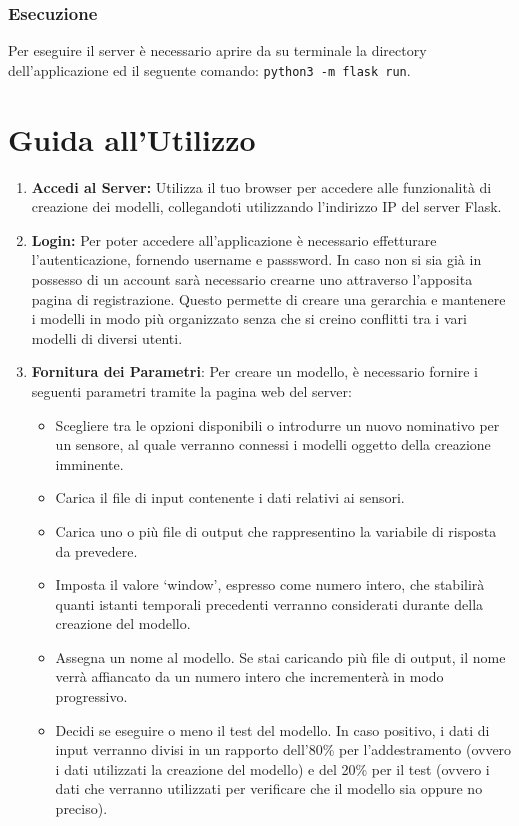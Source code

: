 \documentclass[a4paper,10pt]{article}
\begin{document}
\subsubsection*{Esecuzione}
Per eseguire il server è necessario aprire da su terminale la directory dell'applicazione ed
il seguente comando: \texttt{python3 -m flask run}.



\section{Guida all'Utilizzo}
\begin{enumerate}
  \item \textbf{Accedi al Server:} Utilizza il tuo browser per accedere alle funzionalità di creazione dei modelli, 
  collegandoti utilizzando l'indirizzo IP del server Flask.

  \item \textbf{Login:} Per poter accedere all'applicazione è necessario effetturare l'autenticazione, fornendo username e passsword. In caso non si sia già in possesso
  di un account sarà necessario crearne uno attraverso l'apposita pagina di registrazione. Questo permette di creare una gerarchia e mantenere i modelli 
  in modo più organizzato senza che si creino conflitti tra i vari modelli di diversi utenti.

  \item \textbf{Fornitura dei Parametri}: Per creare un modello, è necessario fornire i seguenti parametri tramite la pagina web del server:
  \begin{itemize}
    \item Scegliere tra le opzioni disponibili o introdurre un nuovo nominativo per un sensore, al quale verranno connessi i modelli oggetto della creazione imminente.
    \item Carica il file di input contenente i dati relativi ai sensori.
    \item Carica uno o più file di output che rappresentino la variabile di risposta da prevedere.
    \item Imposta il valore `window', espresso come numero intero, che stabilirà quanti istanti temporali precedenti verranno considerati durante della creazione del modello.
    \item Assegna un nome al modello. Se stai caricando più file di output, il nome verrà affiancato da un numero intero che incrementerà in modo progressivo.
    \item Decidi se eseguire o meno il test del modello. In caso positivo, i dati di input verranno divisi in un rapporto dell'80\% per l'addestramento 
    (ovvero i dati utilizzati la creazione del modello) e del 20\% per il test (ovvero i dati che verranno utilizzati per verificare che il modello sia oppure no preciso).
  \end{itemize}
  

\end{enumerate}
\end{document}
